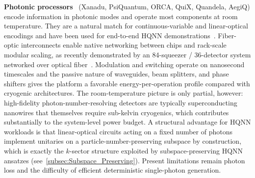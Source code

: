 \documentclass[aps,10pt,groupedaddress,prx,superscriptaddress,twocolumn,balancelastpage, tightenlines]{revtex4-2}
\theoremstyle{plain}  %
\begin{document}
\textbf{Photonic processors}~\cite{bourassa2021blueprint, larsen_integrated_2025, alexander_manufacturable_2025, taballione_20-mode_2023, aghaee_rad_scaling_2025, maring_versatile_2024} (Xanadu, PsiQuantum, ORCA, QuiX, Quandela, AegiQ) encode information in photonic modes and operate most components at room temperature. They are a natural match for continuous-variable and linear-optical encodings and have been used for end-to-end \gls{HQNN} demonstrations~\cite{austin_hybrid_2025, yin_experimental_2025,paparelle_experimental_2026, hoch_variational_2025, sedrakyan_photonic_2024, monbroussou_photonic_2025}. Fiber-optic interconnects enable native networking between chips and rack-scale modular scaling, as recently demonstrated by an 84-squeezer / 36-detector system networked over optical fiber~\cite{aghaee_rad_scaling_2025}. Modulation and switching operate on nanosecond timescales and the passive nature of waveguides, beam splitters, and phase shifters gives the platform a favorable energy-per-operation profile compared with cryogenic architectures. The room-temperature picture is only partial, however: high-fidelity photon-number-resolving detectors are typically superconducting nanowires that themselves require sub-kelvin cryogenics, which contributes substantially to the system-level power budget. A structural advantage for \gls{HQNN} workloads is that linear-optical circuits acting on a fixed number of photons implement unitaries on a particle-number-preserving subspace by construction, which is exactly the $k$-sector structure exploited by subspace-preserving \gls{HQNN} ansatzes (see~\autoref{subsec:Subspace_Preserving}). Present limitations remain photon loss and the difficulty of efficient deterministic single-photon generation.
\end{document}
